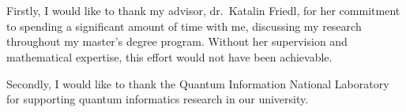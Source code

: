 \chapter*{\koszonetnyilvanitas}

Firstly, I would like to thank my advisor, dr.~Katalin Friedl, for her commitment to spending a significant amount of time with me, discussing my research throughout my master's degree program. Without her supervision and mathematical expertise, this effort would not have been achievable.

Secondly, I would like to thank the Quantum Information National Laboratory for supporting quantum informatics research in our university.